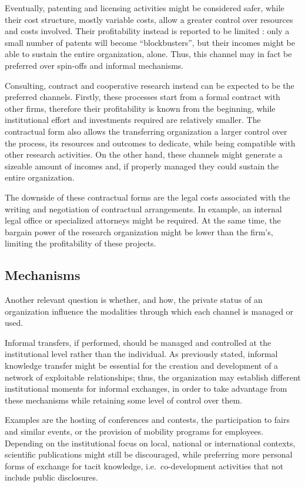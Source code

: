 Eventually, patenting and licensing activities might be considered safer, while their cost structure, mostly variable costs, allow a greater control over resources and costs involved. Their profitability instead is reported to be limited \citep{Balderi2010}: only a small number of patents will become \enquote{blockbusters}, but their incomes might be able to sustain the entire organization, alone. Thus, this channel may in fact be preferred over spin-offs and informal mechanisms.

Consulting, contract and cooperative research instead can be expected to be the preferred channels. Firstly, these processes start from a formal contract with other firms, therefore their profitability is known from the beginning, while institutional effort and investments required are relatively smaller. The contractual form also allows the transferring organization a larger control over the process, its resources and outcomes to dedicate, while being compatible with other research activities. On the other hand, these channels might generate a sizeable amount of incomes and, if properly managed they could sustain the entire organization. 

The downside of these contractual forms are the legal costs associated with the writing and negotiation of contractual arrangements. In example, an internal legal office or specialized attorneys might be required. At the same time, the bargain power of the research organization might be lower than the firm's, limiting the profitability of these projects. 

\subsection{Mechanisms}

Another relevant question is whether, and how, the private status of an organization influence the modalities through which each channel is managed or used. 

Informal transfers, if performed, should be managed and controlled at the institutional level rather than the individual. As previously stated, informal knowledge transfer might be essential for the creation and development of a network of exploitable relationships; thus, the organization may establish different institutional moments for informal exchanges, in order to take advantage from these mechanisms while retaining some level of control over them. 

Examples are the hosting of conferences and contests, the participation to fairs and similar events, or the provision of mobility programs for employees. Depending on the institutional focus on local, national or international contexts, scientific publications might still be discouraged, while preferring more personal forms of exchange for tacit knowledge, i.e.\ co-development activities that not include public disclosures. 


